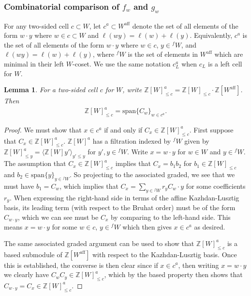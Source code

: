 \documentclass{amsart}
\newtheorem{lemma}[thm]{Lemma}
\theoremstyle{definition}
\begin{document}
\subsubsection{Combinatorial comparison of $f_w$ and $g_w$}
For any two-sided cell $c \subset W$, let $c^a \subset W^{\mathrm{aff}}$ denote the set of all elements of the form $w\cdot y$ where $w \in c \subset W$ and $\ell(wy) = \ell(w) + \ell(y)$. Equivalently, $c^a$ is the set of all elements of the form $w \cdot y$ where $w \in c$, $y \in {}^fW$, and $\ell(wy) = \ell(w) + \ell(y)$, where ${}^fW$ is the set of elements in $W^{\mathrm{aff}}$ which are minimal in their left $W$-coset. We use the same notation $c_L^a$ when $c_L$ is a left cell for $W$.
\begin{lemma}\label{lem:twosided}
For a two-sided cell $c$ for $W$, write $\mathbb{Z}[W]_{\leq c}^a = \mathbb{Z}[W]_{\leq c} \cdot \mathbb{Z}[W^{\mathrm{aff}}]$. Then
\begin{align}
    \mathbb{Z}[W]_{\leq c}^a = \mathrm{span}\{C_w\}_{w \in c^a}.
\end{align}
\end{lemma}
\begin{proof}
We must show that $x \in c^a$ if and only if $C_x \in \mathbb{Z}[W]_{\leq c}^a$. First suppose that $C_x \in \mathbb{Z}[W]_{\leq c}^a$. $\mathbb{Z}[W]^a$ has a filtration indexed by ${}^fW$ given by $\mathbb{Z}[W]^a_{\leq y} = \langle \mathbb{Z}[W]y'\rangle_{y' \leq y}$ for $y', y \in {}^f W$. Write $x = w \cdot y$ for $w \in W$ and $y \in {}^f W$. The assumption that $C_x \in \mathbb{Z}[W]_{\leq c}^a$ implies that $C_x = b_1 b_2$ for $b_1 \in \mathbb{Z}[W]_{\leq c}$ and $b_2 \in \mathrm{span}\{y\}_{y \in {}^f W}$. So projecting to the associated graded, we see that we must have $b_1 = C_w$, which implies that $C_x = \sum_{y \in {}^f W} r_y C_w \cdot y$ for some coefficients $r_y$. When expressing the right-hand side in terms of the affine Kazhdan-Lusztig basis, its leading term (with respect to the Bruhat order) must be of the form $C_{w \cdot y}$, which we can see must be $C_x$ by comparing to the left-hand side. This means $x = w \cdot y$ for some $w \in c$, $y \in {}^f W$ which then gives $x \in c^a$ as desired.
    
The same associated graded argument can be used to show that $\mathbb{Z}[W]_{\leq c}^a$ is a based submodule of $\mathbb{Z}[W^{\mathrm{aff}}]$ with respect to the Kazhdan-Lusztig basis. Once this is established, the converse is then clear since if $x \in c^a$, then writing $x = w \cdot y$ we clearly have $C_w C_y \in \mathbb{Z}[W]_{\leq c}^a$, which by the based property then shows that $C_{w\cdot y} = C_x \in \mathbb{Z}[W]_{\leq c}^a$.
\end{proof}
\end{document}
